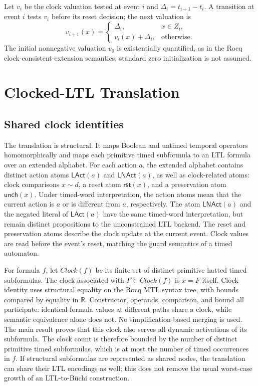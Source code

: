 \documentclass[10pt,journal,compsoc]{IEEEtran}
\newcommand{\Real}{\mathbb{R}}
\newcommand{\Reset}{\mathsf{rst}}
\newcommand{\Unch}{\mathsf{unch}}
\newcommand{\Clock}{\mathit{Clock}}
\begin{document}
Let $v_i$ be the clock valuation tested at event $i$ and
$\Delta_i=t_{i+1}-t_i$. A transition at event $i$ tests $v_i$ before its
reset decision; the next valuation is
\[
v_{i+1}(x)=
\begin{cases}
\Delta_i,&x\in Z_i,\\
v_i(x)+\Delta_i,&\text{otherwise.}
\end{cases}
\]
The initial nonnegative valuation $v_0$ is existentially quantified, as in
the Rocq clock-consistent-extension semantics; standard zero initialization
is not assumed.

\section{Clocked-LTL Translation}
\label{sec:translation}
\subsection{Shared clock identities}
The translation is structural. It maps Boolean and untimed temporal
operators homomorphically and maps each primitive timed subformula to an LTL
formula over an extended alphabet. For each action $a$, the extended
alphabet contains distinct action atoms $\mathsf{LAct}(a)$ and
$\mathsf{LNAct}(a)$, as well as clock-related atoms: clock comparisons
$x\sim d$, a reset atom
$\Reset(x)$, and a preservation atom $\Unch(x)$. Under timed-word
interpretation, the action atoms mean that the current action is $a$ or is
different from $a$, respectively. The atom $\mathsf{LNAct}(a)$ and the
negated literal of $\mathsf{LAct}(a)$ have the same timed-word interpretation,
but remain distinct propositions to the unconstrained LTL backend. The reset
and preservation atoms describe the clock update at the current event. Clock
values are read before the event's reset, matching the guard semantics of a
timed automaton.

For formula $f$, let $\Clock(f)$ be its finite set of distinct primitive
hatted timed subformulas. The clock associated with $F\in\Clock(f)$ is
$x=F$ itself. Clock identity uses structural equality on the Rocq MTL syntax
tree, with bounds compared by equality in $\Real$. Constructor, operands,
comparison, and bound all participate: identical formula values at different
paths share a clock, while semantic equivalence alone does not. No
simplification-based merging is used. The main result proves that this clock
also serves all dynamic activations of its subformula.
The clock count is therefore bounded by the number of distinct primitive
timed subformulas, which is at most the number of timed occurrences in $f$.
If structural subformulas are represented as shared nodes, the translation
can share their LTL encodings as well; this does not remove the usual
worst-case growth of an LTL-to-B\"uchi construction.
\end{document}
